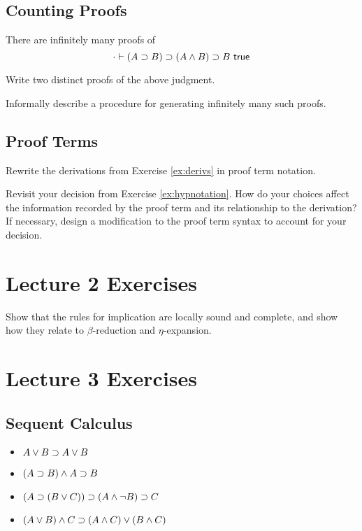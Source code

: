 \documentclass{article}
\begin{document}
\subsection{Counting Proofs}

There are infinitely many proofs of
\[
  \cdot \vdash (A \supset B) \supset (A \wedge B) \supset B \ \mathsf{true}
\]


\begin{exercise}
  Write two distinct proofs of 
  the above judgment.
\end{exercise}

\begin{exercise}
  Informally describe a procedure for generating infinitely many
  such proofs.
\end{exercise}

\subsection{Proof Terms}

\begin{exercise}
  Rewrite the derivations from Exercise \ref{ex:derivs} in proof term notation.
\end{exercise}

\begin{exercise}
  Revisit your decision from Exercise \ref{ex:hypnotation}.
  How do your choices affect the information recorded by the
  proof term and its relationship to the derivation?
  If necessary, design a modification to the proof term
  syntax to account for your decision.
\end{exercise}


\section{Lecture 2 Exercises}

\begin{exercise}
    Show that the rules for implication are locally sound and complete, and show how they relate to $\beta$-reduction and $\eta$-expansion.
\end{exercise}


\section{Lecture 3 Exercises}

\subsection{Sequent Calculus}
\begin{itemize}
  \item $A \vee B \supset A \vee B$
  \item $(A \supset B) \wedge A \supset B$
  \item $(A \supset (B \vee C)) \supset (A \wedge \neg B) \supset C$
  \item $(A \vee B) \wedge C \supset (A \wedge C) \vee (B \wedge C)$
\end{itemize}
\end{document}
